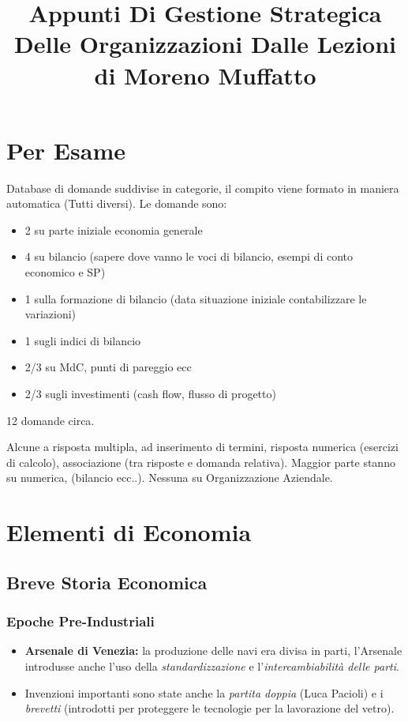 \documentclass[a4paper,portrait,12pt]{article}
\theoremstyle{definition}
\begin{document}
\title{Appunti Di Gestione Strategica Delle Organizzazioni\vspace{1cm}
\large Dalle Lezioni di Moreno Muffatto}

\maketitle
\date
\newpage

\tableofcontents



\newpage
\section{Per Esame}



Database di domande suddivise in categorie, il compito viene formato in maniera automatica (Tutti diversi).
Le domande sono:
\begin{itemize}
\item 2 su parte iniziale economia generale
\item 4 su bilancio (sapere dove vanno le voci di bilancio, esempi di conto economico e SP)
\item 1 sulla formazione di bilancio (data situazione iniziale contabilizzare le variazioni)
\item 1 sugli indici di bilancio
\item 2/3 su MdC, punti di pareggio ecc
\item 2/3 sugli investimenti (cash flow, flusso di progetto)
\end{itemize}

12 domande circa.

Alcune a risposta multipla, ad inserimento di termini, risposta numerica (esercizi di calcolo), associazione (tra risposte e domanda relativa).
Maggior parte stanno su numerica, (bilancio ecc..).
Nessuna su Organizzazione Aziendale.



\newpage
\section{Elementi di Economia}


\subsection{Breve Storia Economica}

\subsubsection{Epoche Pre-Industriali}
\begin{itemize}
\item \textbf{Arsenale di Venezia:} la produzione delle navi era divisa in parti, l'Arsenale introdusse anche l'uso della \emph{standardizzazione} e l'\emph{intercambiabilità delle parti}.
\item Invenzioni importanti sono state anche la \emph{partita doppia} (Luca Pacioli) e i \emph{brevetti} (introdotti per proteggere le tecnologie per la lavorazione del vetro). 
\end{itemize}
\end{document}
